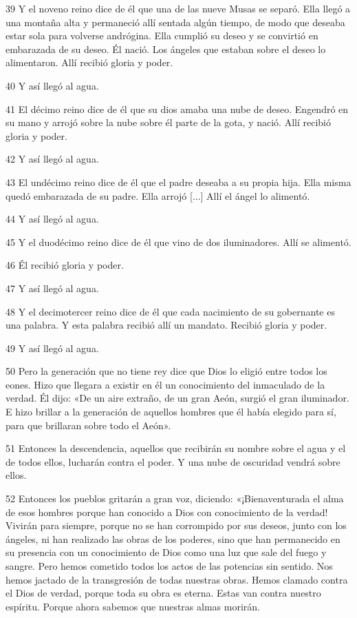 \par 39 Y el noveno reino dice de él que una de las nueve Musas se separó. Ella llegó a una montaña alta y permaneció allí sentada algún tiempo, de modo que deseaba estar sola para volverse andrógina. Ella cumplió su deseo y se convirtió en embarazada de su deseo. Él nació. Los ángeles que estaban sobre el deseo lo alimentaron. Allí recibió gloria y poder.
\par 40 Y así llegó al agua.
\par 41 El décimo reino dice de él que su dios amaba una nube de deseo. Engendró en su mano y arrojó sobre la nube sobre él parte de la gota, y nació. Allí recibió gloria y poder.
\par 42 Y así llegó al agua.
\par 43 El undécimo reino dice de él que el padre deseaba a su propia hija. Ella misma quedó embarazada de su padre. Ella arrojó [...] Allí el ángel lo alimentó.
\par 44 Y así llegó al agua.

\par 45 Y el duodécimo reino dice de él que vino de dos iluminadores. Allí se alimentó.
\par 46 Él recibió gloria y poder.
\par 47 Y así llegó al agua.

\par 48 Y el decimotercer reino dice de él que cada nacimiento de su gobernante es una palabra. Y esta palabra recibió allí un mandato. Recibió gloria y poder.
\par 49 Y así llegó al agua.
\par 50 Pero la generación que no tiene rey dice que Dios lo eligió entre todos los eones. Hizo que llegara a existir en él un conocimiento del inmaculado de la verdad. Él dijo: «De un aire extraño, de un gran Aeón, surgió el gran iluminador. E hizo brillar a la generación de aquellos hombres que él había elegido para sí, para que brillaran sobre todo el Aeón».

\par 51 Entonces la descendencia, aquellos que recibirán su nombre sobre el agua y el de todos ellos, lucharán contra el poder. Y una nube de oscuridad vendrá sobre ellos.

\par 52 Entonces los pueblos gritarán a gran voz, diciendo: «¡Bienaventurada el alma de esos hombres porque han conocido a Dios con conocimiento de la verdad! Vivirán para siempre, porque no se han corrompido por sus deseos, junto con los ángeles, ni han realizado las obras de los poderes, sino que han permanecido en su presencia con un conocimiento de Dios como una luz que sale del fuego y sangre. Pero hemos cometido todos los actos de las potencias sin sentido. Nos hemos jactado de la transgresión de todas nuestras obras. Hemos clamado contra el Dios de verdad, porque toda su obra es eterna. Estas van contra nuestro espíritu. Porque ahora sabemos que nuestras almas morirán.

